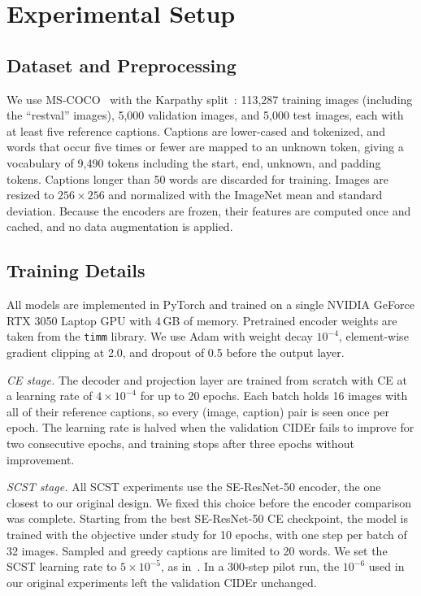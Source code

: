 \documentclass[conference]{IEEEtran}
\begin{document}
\section{Experimental Setup}
\subsection{Dataset and Preprocessing}
We use MS-COCO~\cite{lin2014microsoft} with the Karpathy
split~\cite{karpathy2015deep}: 113{,}287 training images (including the
``restval'' images), 5{,}000 validation images, and 5{,}000 test images, each
with at least five reference captions. Captions are lower-cased and tokenized,
and words that occur five times or fewer are mapped to an unknown token, giving
a vocabulary of 9{,}490 tokens including the start, end, unknown, and padding
tokens. Captions longer than 50 words are discarded for training. Images are
resized to $256\times256$ and normalized with the ImageNet mean and standard
deviation. Because the encoders are frozen, their features are computed once
and cached, and no data augmentation is applied.

\subsection{Training Details}
\label{sec:training}
All models are implemented in PyTorch and trained on a single NVIDIA GeForce
RTX 3050 Laptop GPU with 4\,GB of memory. Pretrained encoder weights are taken
from the \texttt{timm} library. We use Adam with weight decay $10^{-4}$,
element-wise gradient clipping at 2.0, and dropout of 0.5 before the output
layer.

\textit{CE stage.} The decoder and projection layer are trained from scratch
with CE at a learning rate of $4\times10^{-4}$ for up to 20 epochs. Each batch
holds 16 images with all of their
reference captions, so every (image, caption) pair is seen once per epoch. The
learning rate is halved when the validation CIDEr fails to improve for two
consecutive epochs, and training stops after three epochs without improvement.

\textit{SCST stage.} All SCST experiments use the SE-ResNet-50 encoder, the one
closest to our original design. We fixed this choice before the encoder
comparison was complete. Starting from the best SE-ResNet-50 CE checkpoint, the
model is trained with the objective under study for 10 epochs, with one step
per batch of 32 images. Sampled and greedy captions are limited to 20
words. We set the SCST learning rate to $5\times10^{-5}$, as
in~\cite{rennie2017self}. In a 300-step pilot run, the $10^{-6}$ used in our
original experiments left the validation CIDEr unchanged.
\end{document}
